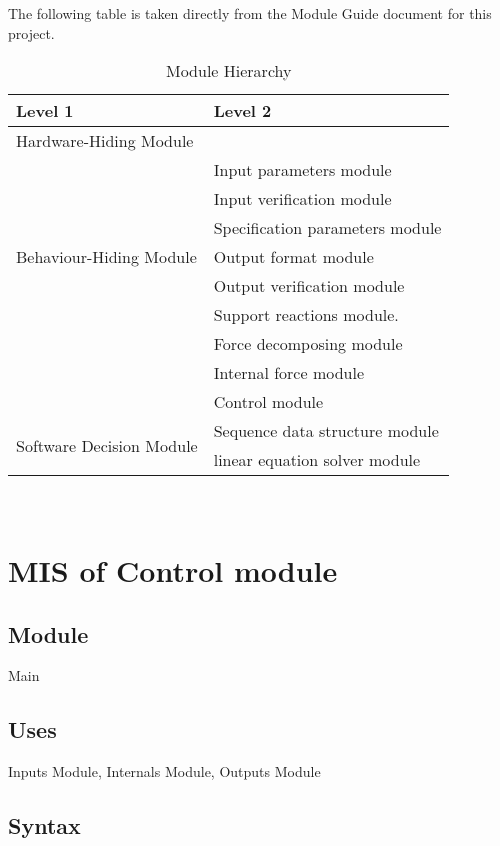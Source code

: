 \documentclass[12pt, titlepage]{article}
\begin{document}
The following table is taken directly from the Module Guide document for this project.

\begin{table}[h!]
\centering
\begin{tabular}{p{} p{}}
\toprule
\textbf{Level 1} & \textbf{Level 2}\\
\midrule

{Hardware-Hiding Module} & ~ \\
\midrule

\multirow{7}{0.3\textwidth}{Behaviour-Hiding Module} & Input parameters module\\
& Input verification module\\
& Specification parameters module\\
& Output format module\\
& Output verification module\\
& Support reactions module. \\
& Force decomposing module\\
& Internal force module\\
& Control module\\ 

\midrule

\multirow{3}{0.3\textwidth}{Software Decision Module} & Sequence data structure module\\
& linear equation solver module\\
\bottomrule

\end{tabular}
\caption{Module Hierarchy}
\label{TblMH}
\end{table}
\newpage
~\newpage

\section{MIS of Control module \label{mControl} }

\subsection{Module}

Main

\subsection{Uses}
Inputs Module, Internals Module, Outputs Module

\subsection{Syntax}
\end{document}
